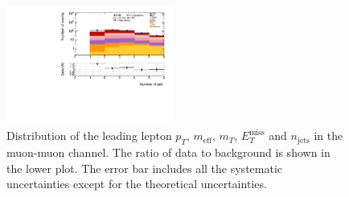 \begin{figure}[htbp]
\begin{center}
\includegraphics[width=0.49\textwidth]{data/plot/Fake_VR/nJet_VR_Fake_mumu}
\end{center}
\caption{Distribution of the  leading lepton $p_T$, $m_{\text{eff}}$, $m_T$, $E_{T}^{\text{miss}}$ and $n_{\text{jets}}$ in the muon-muon channel. The ratio of data to background is shown in the lower plot. The error bar includes all the systematic uncertainties except for the theoretical uncertainties.}
\label{fig:VRSS_fake_mumu}
\end{figure}

